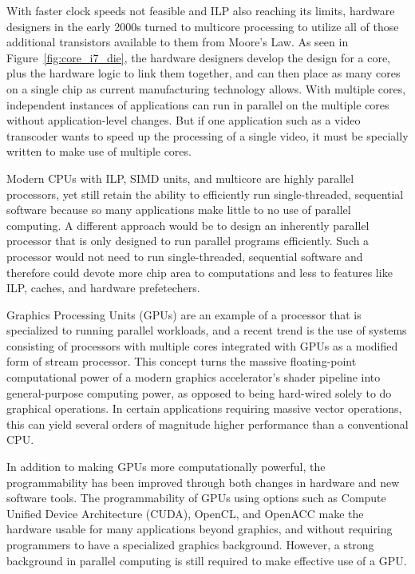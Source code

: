 \documentclass{JINST}
\begin{document}
With faster clock speeds not feasible and ILP also reaching its limits, hardware designers in the early 2000s turned to multicore processing to utilize all of those additional transistors available to them from Moore's Law.  As seen in Figure~\ref{fig:core_i7_die}, the hardware designers develop the design for a core, plus the hardware logic to link them together, and can then place as many cores on a single chip as current manufacturing technology allows.  With multiple cores, independent instances of applications can run in parallel on the multiple cores without application-level changes.  But if one application such as a video transcoder wants to speed up the processing of a single video, it must be specially written to make use of multiple cores.

Modern CPUs with ILP, SIMD units, and multicore are highly parallel processors, yet still retain the ability to efficiently run single-threaded, sequential software because so many applications make little to no use of parallel computing.  A different approach would be to design an inherently parallel processor that is only designed to run parallel programs efficiently.  Such a processor would not need to run single-threaded, sequential software and therefore could devote more chip area to computations and less to features like ILP, caches, and hardware prefetechers.

Graphics Processing Units (GPUs) are an example of a processor that is specialized to running parallel workloads, and a
recent trend is the use of systems consisting of processors with multiple cores integrated with GPUs as a modified form
of stream processor. This concept turns the massive floating-point computational power of a modern graphics
accelerator's shader pipeline into general-purpose computing power, as opposed to being hard-wired solely to do
graphical operations. In certain applications requiring massive vector operations, this can yield several orders of
magnitude higher performance than a conventional CPU.

In addition to making GPUs more computationally powerful, the programmability has been improved through both changes in hardware and new software tools.  The programmability of GPUs using options such as Compute Unified Device Architecture (CUDA), OpenCL, and OpenACC make the hardware usable for many applications beyond graphics, and without requiring programmers to have a specialized graphics background.  However, a strong background in parallel computing is still required to make effective use of a GPU.
\end{document}
